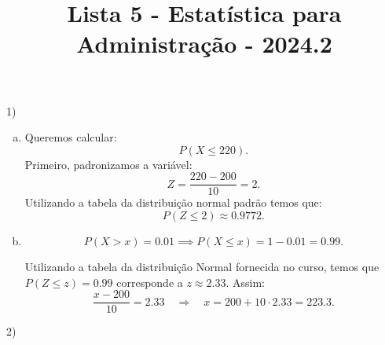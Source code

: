 \documentclass{article}
\title{Lista 5 - Estatística para Administração - 2024.2}
\begin{document}
\date{}
\maketitle

1) 

\begin{enumerate}[a)]
    \item Queremos calcular:
    \[
    P(X \leq 220).
    \]
    Primeiro, padronizamos a variável:
    \[
     Z = \frac{220 - 200}{10} = 2.
    \]
    Utilizando a tabela da distribuição normal padrão temos que:
    \[
    P(Z \leq 2) \approx 0.9772.
    \]


    \item 
    \[
    P(X > x) = 0.01 \implies P(X \leq x) = 1 - 0.01 = 0.99.
    \]


    Utilizando a tabela da distribuição Normal fornecida no curso, temos que $P(Z \leq z) = 0.99$ corresponde a $z \approx 2.33$. Assim:
    \[
    \frac{x - 200}{10} = 2.33 \quad \Rightarrow \quad x = 200 + 10 \cdot 2.33 = 223.3.
    \]

\end{enumerate}


2) 
\end{document}
